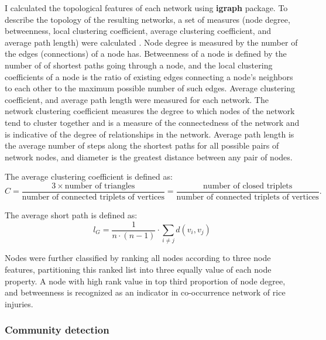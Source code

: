 I calculated the topological features of each network using \textbf{igraph} package. To describe the topology of the resulting networks, a set of measures (node degree, betweenness, local clustering coefficient, average clustering coefficient, and average path length) were calculated \citep{Newman_2006_Modularity}. Node degree is measured by the number of the edges (connections) of a node has. Betweenness of a node is defined by the number of of shortest paths going through a node, and the local clustering coefficients of a node is the ratio of existing edges connecting a node's neighbors to each other to the maximum possible number of such edges. Average clustering coefficient, and average path length were measured for each network. The network clustering coefficient measures the degree to which nodes of the network tend to cluster together and is a measure of the connectedness of the network and is indicative of the degree of relationships in the network. Average path length is the average number of steps along the shortest paths for all possible pairs of network nodes, and diameter is the greatest distance between any pair of nodes. 

The average clustering coefficient is defined as:
\begin{equation}
C = \frac{3 \times \mbox{number of triangles}}{\mbox{number of connected triplets of vertices}} = \frac{\mbox{number of closed triplets}}{\mbox{number of connected triplets of vertices}}.
\end{equation}

The average short path is defined as:
\begin{equation}
l_G = \frac{1}{n \cdot (n - 1)} \cdot \sum_{i \ne j} d(v_i, v_j)
\end{equation}

Nodes were further classified by ranking all nodes according to three node features, partitioning this ranked list into three equally value of each node property. A node with high rank value in top third proportion of node degree, and betweenness is recognized as an indicator in co-occurrence network of rice injuries. 

\subsubsection{Community detection}

